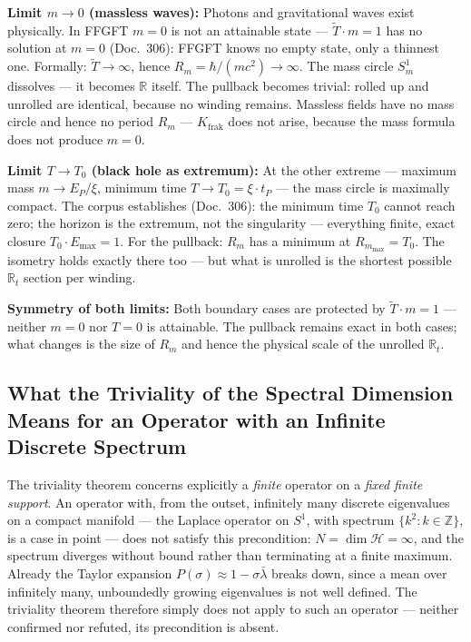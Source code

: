 \textbf{Limit $m\to 0$ (massless waves):}
Photons and gravitational waves exist physically. In FFGFT $m=0$
is not an attainable state --- $\tilde{T}\cdot m=1$ has no solution
at $m=0$ (Doc.~306): FFGFT knows no empty state, only a thinnest
one. Formally: $\tilde{T}\to\infty$, hence
$R_m=\hbar/(mc^2)\to\infty$. The mass circle $S^1_m$ dissolves ---
it becomes $\mathbb{R}$ itself. The pullback becomes trivial:
rolled up and unrolled are identical, because no winding remains.
Massless fields have no mass circle and hence no period $R_m$ ---
$K_\text{frak}$ does not arise, because the mass formula does not
produce $m=0$.

\textbf{Limit $T\to T_0$ (black hole as extremum):}
At the other extreme --- maximum mass $m\to E_P/\xi$, minimum
time $T\to T_0=\xi\cdot t_P$ --- the mass circle is maximally
compact. The corpus establishes (Doc.~306): the minimum time $T_0$
cannot reach zero; the horizon is the extremum, not the singularity
--- everything finite, exact closure $T_0\cdot E_\text{max}=1$.
For the pullback: $R_m$ has a minimum at $R_{m_\text{max}}=T_0$.
The isometry holds exactly there too --- but what is unrolled is
the shortest possible $\mathbb{R}_t$ section per winding.

\textbf{Symmetry of both limits:}
Both boundary cases are protected by $\tilde{T}\cdot m=1$ ---
neither $m=0$ nor $T=0$ is attainable. The pullback remains exact
in both cases; what changes is the size of $R_m$ and hence the
physical scale of the unrolled $\mathbb{R}_t$.

\subsection{What the Triviality of the Spectral Dimension Means for an Operator with an Infinite Discrete Spectrum}

The triviality theorem concerns explicitly a \emph{finite} operator on a
\emph{fixed finite support}. An operator with, from the outset, infinitely
many discrete eigenvalues on a compact manifold — the Laplace operator on
$S^1$, with spectrum $\{k^2:k\in\mathbb{Z}\}$, is a case in point — does
not satisfy this precondition: $N=\dim\mathcal H=\infty$, and the spectrum
diverges without bound rather than terminating at a finite maximum.
Already the Taylor expansion $P(\sigma)\approx1-\sigma\bar\lambda$ breaks
down, since a mean over infinitely many, unboundedly growing eigenvalues
is not well defined. The triviality theorem therefore simply does not
apply to such an operator — neither confirmed nor refuted, its
precondition is absent.

